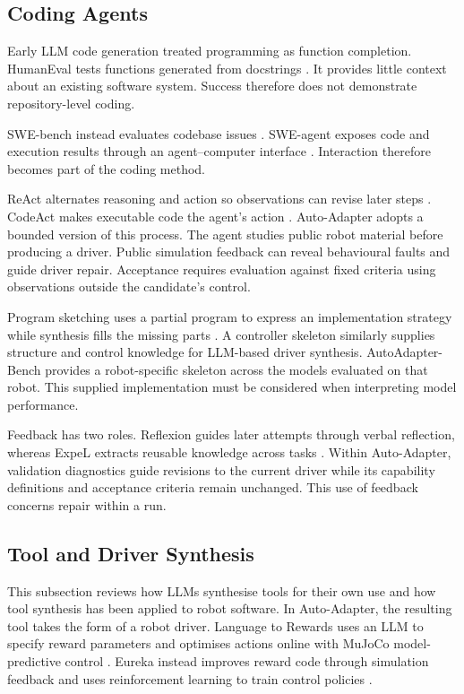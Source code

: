 \subsection{Coding Agents}
\label{sec:coding-agents}

Early LLM code generation treated programming as function completion. HumanEval
tests functions generated from docstrings \citep{chen2021codex}. It provides
little context about an existing software system. Success therefore does not
demonstrate repository-level coding.

SWE-bench instead evaluates codebase issues \citep{jimenez2024swebench}.
SWE-agent exposes code and execution results through an agent--computer
interface \citep{yang2024sweagent}. Interaction therefore becomes part of the
coding method.

ReAct alternates reasoning and action so observations can revise later steps
\citep{yao2023react}. CodeAct makes executable code the agent's action
\citep{wang2024codeact}. Auto-Adapter adopts a bounded version of this process.
The agent studies public robot material before producing a driver.
Public simulation feedback can reveal behavioural
faults and guide driver repair. Acceptance requires evaluation against fixed
criteria using observations outside the candidate's control.

Program sketching uses a partial program to express an implementation strategy
while synthesis fills the missing parts \citep{solarlezama2013sketching}. A
controller skeleton similarly supplies structure and control knowledge for
LLM-based driver synthesis. AutoAdapter-Bench provides a robot-specific skeleton
across the models evaluated on that robot. This supplied implementation must be
considered when interpreting model performance.

Feedback has two roles. Reflexion guides later attempts through verbal
reflection, whereas ExpeL extracts reusable knowledge across tasks
\citep{shinn2023reflexion,zhao2024expel}. Within Auto-Adapter, validation
diagnostics guide revisions to the current driver while its capability
definitions and acceptance criteria remain unchanged. This use of feedback
concerns repair within a run.

\subsection{Tool and Driver Synthesis}
\label{sec:tool-driver-synthesis}

This subsection reviews how LLMs synthesise tools for their own use and how
tool synthesis has been applied to robot software. In Auto-Adapter, the
resulting tool takes the form of a robot driver. Language to Rewards uses an
LLM to specify reward parameters and optimises actions online with MuJoCo
model-predictive control \citep{yu2023language2reward}. Eureka instead improves
reward code through simulation feedback and uses reinforcement learning to
train control policies \citep{ma2024eureka}.

